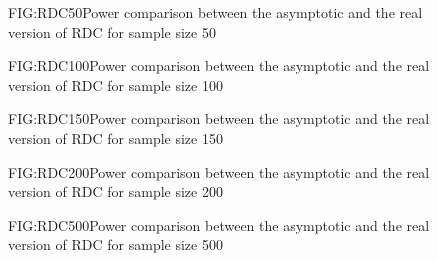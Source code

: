 \begin{figure}[RDC asymptotic size 50]{FIG:RDC50}{Power comparison between the asymptotic and the real version of RDC for sample size 50}
\end{figure}
\begin{figure}[RDC asymptotic size 100]{FIG:RDC100}{Power comparison between the asymptotic and the real version of RDC for sample size 100}
\end{figure}
\begin{figure}[RDC asymptotic size 150]{FIG:RDC150}{Power comparison between the asymptotic and the real version of RDC for sample size 150}
\end{figure}
\begin{figure}[RDC asymptotic size 200]{FIG:RDC200}{Power comparison between the asymptotic and the real version of RDC for sample size 200}
\end{figure}
\begin{figure}[RDC asymptotic size 500]{FIG:RDC500}{Power comparison between the asymptotic and the real version of RDC for sample size 500}
\end{figure}
